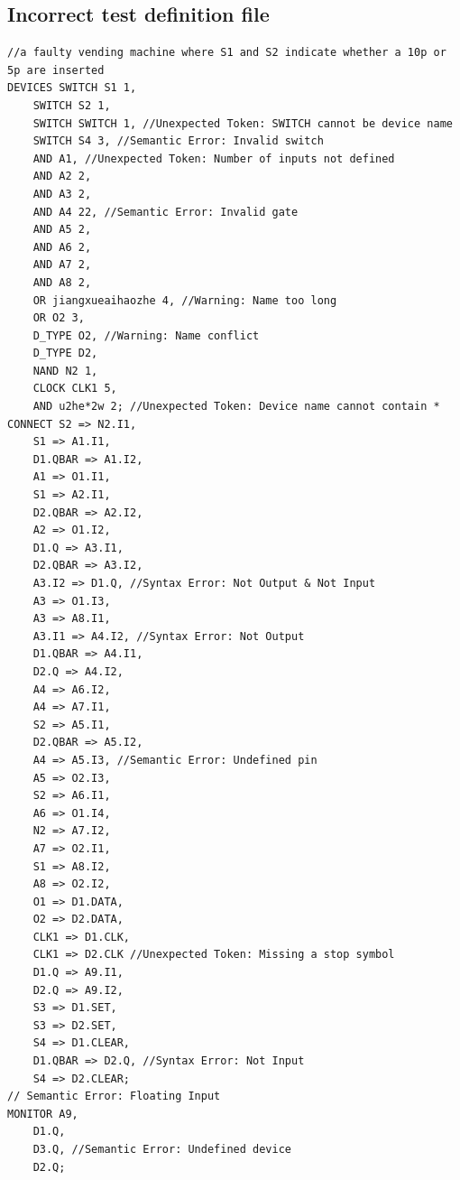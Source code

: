 \documentclass[12pt]{article}
\begin{document}
\subsection{Incorrect test definition file}
\begin{verbatim}
//a faulty vending machine where S1 and S2 indicate whether a 10p or 5p are inserted
DEVICES	SWITCH S1 1, 
	SWITCH S2 1,
	SWITCH SWITCH 1, //Unexpected Token: SWITCH cannot be device name
	SWITCH S4 3, //Semantic Error: Invalid switch
	AND A1, //Unexpected Token: Number of inputs not defined
	AND A2 2,
	AND A3 2,
	AND A4 22, //Semantic Error: Invalid gate
	AND A5 2,
	AND A6 2,
	AND A7 2,
	AND A8 2,
	OR jiangxueaihaozhe 4, //Warning: Name too long
	OR O2 3,
	D_TYPE O2, //Warning: Name conflict
	D_TYPE D2,
	NAND N2 1,
	CLOCK CLK1 5,
	AND u2he*2w 2; //Unexpected Token: Device name cannot contain *
CONNECT	S2 => N2.I1,
	S1 => A1.I1,
	D1.QBAR => A1.I2,
	A1 => O1.I1,
	S1 => A2.I1,
	D2.QBAR => A2.I2,
	A2 => O1.I2,
	D1.Q => A3.I1,
	D2.QBAR => A3.I2,
	A3.I2 => D1.Q, //Syntax Error: Not Output & Not Input
	A3 => O1.I3,
	A3 => A8.I1,
	A3.I1 => A4.I2, //Syntax Error: Not Output
	D1.QBAR => A4.I1,
	D2.Q => A4.I2,
	A4 => A6.I2,
	A4 => A7.I1,
	S2 => A5.I1,
	D2.QBAR => A5.I2,
	A4 => A5.I3, //Semantic Error: Undefined pin
	A5 => O2.I3,
	S2 => A6.I1,
	A6 => O1.I4,
	N2 => A7.I2,
	A7 => O2.I1,
	S1 => A8.I2,
	A8 => O2.I2,
	O1 => D1.DATA,
	O2 => D2.DATA,
	CLK1 => D1.CLK,
	CLK1 => D2.CLK //Unexpected Token: Missing a stop symbol
	D1.Q => A9.I1,
	D2.Q => A9.I2,
	S3 => D1.SET,
	S3 => D2.SET,
	S4 => D1.CLEAR,
	D1.QBAR => D2.Q, //Syntax Error: Not Input
	S4 => D2.CLEAR;
// Semantic Error: Floating Input
MONITOR	A9,
	D1.Q,
	D3.Q, //Semantic Error: Undefined device
	D2.Q;
\end{verbatim}
\end{document}
